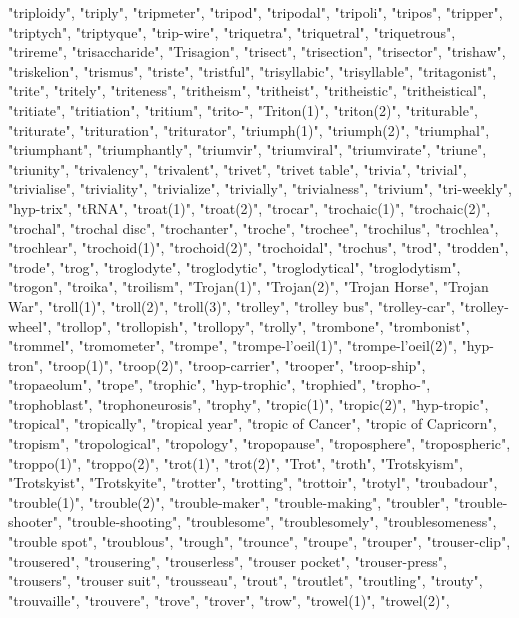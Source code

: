 "triploidy",
"triply",
"tripmeter",
"tripod",
"tripodal",
"tripoli",
"tripos",
"tripper",
"triptych",
"triptyque",
"trip-wire",
"triquetra",
"triquetral",
"triquetrous",
"trireme",
"trisaccharide",
"Trisagion",
"trisect",
"trisection",
"trisector",
"trishaw",
"triskelion",
"trismus",
"triste",
"tristful",
"trisyllabic",
"trisyllable",
"tritagonist",
"trite",
"tritely",
"triteness",
"tritheism",
"tritheist",
"tritheistic",
"tritheistical",
"tritiate",
"tritiation",
"tritium",
"trito-",
"Triton(1)",
"triton(2)",
"triturable",
"triturate",
"trituration",
"triturator",
"triumph(1)",
"triumph(2)",
"triumphal",
"triumphant",
"triumphantly",
"triumvir",
"triumviral",
"triumvirate",
"triune",
"triunity",
"trivalency",
"trivalent",
"trivet",
"trivet table",
"trivia",
"trivial",
"trivialise",
"triviality",
"trivialize",
"trivially",
"trivialness",
"trivium",
"tri-weekly",
"hyp-trix",
"tRNA",
"troat(1)",
"troat(2)",
"trocar",
"trochaic(1)",
"trochaic(2)",
"trochal",
"trochal disc",
"trochanter",
"troche",
"trochee",
"trochilus",
"trochlea",
"trochlear",
"trochoid(1)",
"trochoid(2)",
"trochoidal",
"trochus",
"trod",
"trodden",
"trode",
"trog",
"troglodyte",
"troglodytic",
"troglodytical",
"troglodytism",
"trogon",
"troika",
"troilism",
"Trojan(1)",
"Trojan(2)",
"Trojan Horse",
"Trojan War",
"troll(1)",
"troll(2)",
"troll(3)",
"trolley",
"trolley bus",
"trolley-car",
"trolley-wheel",
"trollop",
"trollopish",
"trollopy",
"trolly",
"trombone",
"trombonist",
"trommel",
"tromometer",
"trompe",
"trompe-l'oeil(1)",
"trompe-l'oeil(2)",
"hyp-tron",
"troop(1)",
"troop(2)",
"troop-carrier",
"trooper",
"troop-ship",
"tropaeolum",
"trope",
"trophic",
"hyp-trophic",
"trophied",
"tropho-",
"trophoblast",
"trophoneurosis",
"trophy",
"tropic(1)",
"tropic(2)",
"hyp-tropic",
"tropical",
"tropically",
"tropical year",
"tropic of Cancer",
"tropic of Capricorn",
"tropism",
"tropological",
"tropology",
"tropopause",
"troposphere",
"tropospheric",
"troppo(1)",
"troppo(2)",
"trot(1)",
"trot(2)",
"Trot",
"troth",
"Trotskyism",
"Trotskyist",
"Trotskyite",
"trotter",
"trotting",
"trottoir",
"trotyl",
"troubadour",
"trouble(1)",
"trouble(2)",
"trouble-maker",
"trouble-making",
"troubler",
"trouble-shooter",
"trouble-shooting",
"troublesome",
"troublesomely",
"troublesomeness",
"trouble spot",
"troublous",
"trough",
"trounce",
"troupe",
"trouper",
"trouser-clip",
"trousered",
"trousering",
"trouserless",
"trouser pocket",
"trouser-press",
"trousers",
"trouser suit",
"trousseau",
"trout",
"troutlet",
"troutling",
"trouty",
"trouvaille",
"trouvere",
"trove",
"trover",
"trow",
"trowel(1)",
"trowel(2)",
